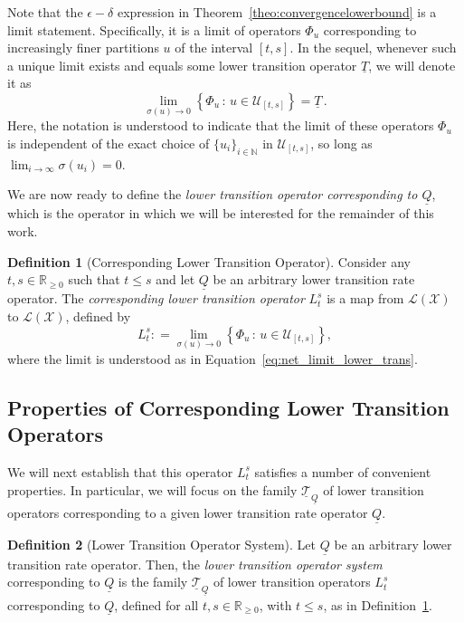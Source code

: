 \documentclass[10pt,a4paper]{paper}
\theoremstyle{definition}
\newtheorem{definition}{Definition}
\newcommand{\nats}{\mathbb{N}}
\newcommand{\reals}{\mathbb{R}}
\newcommand{\realsnonneg}{\reals_{\geq 0}}
\newcommand{\states}{\mathcal{X}}
\newcommand{\lt}{\underline{T}}
\newcommand{\lbound}{L}
\newcommand{\gambles}{\mathcal{L}}
\newcommand{\gamblesX}{\gambles(\states)}
\newcommand{\lrate}{\underline{Q}}
\newcommand{\coloneqq}{:\!=}
\begin{document}
Note that the $\epsilon-\delta$ expression in Theorem~\ref{theo:convergencelowerbound} is a limit statement. Specifically, it is a limit of operators $\Phi_{u}$ corresponding to increasingly finer partitions $u$ of the interval $[t,s]$. In the sequel, whenever such a unique limit exists and equals some lower transition operator $\lt$, we will denote it as
\begin{equation}\label{eq:net_limit_lower_trans}
\lim_{\sigma(u)\to0}\left\{\Phi_u\,\colon\,u\in\mathcal{U}_{[t,s]}\right\} = \lt\,.
\end{equation}
Here, the notation is understood to indicate that the limit of these operators $\Phi_{u}$ is independent of the exact choice of $\{u_i\}_{i\in\nats}$ in $\mathcal{U}_{[t,s]}$, so long as $\lim_{i\to\infty}\sigma(u_i)=0$.

We are now ready to define the \emph{lower transition operator corresponding to $\lrate$}, which is the operator in which we will be interested for the remainder of this work.

\begin{definition}[Corresponding Lower Transition Operator]\label{def:low_trans}
Consider any $t,s\in\realsnonneg$ such that $t\leq s$ and let $\lrate$ be an arbitrary lower transition rate operator. The \emph{corresponding lower transition operator} $\lbound_t^s$ is a map from $\gamblesX$ to $\gamblesX$, defined by
\begin{equation*}%
\lbound_t^s\coloneqq\lim_{\sigma(u)\to0}\left\{ \Phi_u\,\colon\,u\in\mathcal{U}_{[t,s]}\right\},
\end{equation*}
where the limit is understood as in Equation~\eqref{eq:net_limit_lower_trans}.
\end{definition}

\subsection{Properties of Corresponding Lower Transition Operators}\label{sec:properties_lower_trans}

We will next establish that this operator $L_t^s$ satisfies a number of convenient properties. In particular, we will focus on the family $\underline{\mathcal{T}}_{\lrate}$ of lower transition operators corresponding to a given lower transition rate operator $\lrate$.

\begin{definition}[Lower Transition Operator System]
Let $\lrate$ be an arbitrary lower transition rate operator. Then, the \emph{lower transition operator system} corresponding to $\lrate$ is the family $\underline{\mathcal{T}}_{\lrate}$ of lower transition operators $L_t^s$ corresponding to $\lrate$, defined for all $t,s\in\realsnonneg$, with $t\leq s$, as in Definition~\ref{def:low_trans}.
\end{definition}
\end{document}
